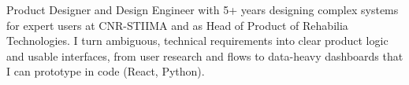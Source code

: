{Product Designer and Design Engineer with 5+ years designing complex systems for expert users at CNR-STIIMA and as Head of Product of Rehabilia Technologies. I turn ambiguous, technical requirements into clear product logic and usable interfaces, from user research and flows to data-heavy dashboards that I can prototype in code (React, Python).}

